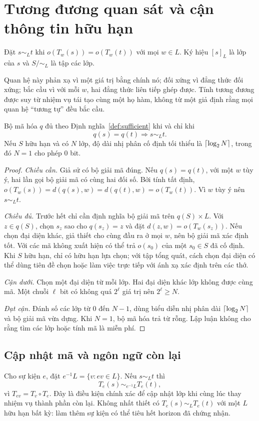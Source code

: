 \section{Tương đương quan sát và cận thông tin hữu hạn}\label{sec:finite}
\begin{definition}
Đặt $s\sim_L t$ khi $o(T_w(s))=o(T_w(t))$ với mọi $w\in L$. Ký hiệu $[s]_L$ là lớp của $s$ và $S/{\sim_L}$ là tập các lớp.
\end{definition}
Quan hệ này phản xạ vì một giá trị bằng chính nó; đối xứng vì đẳng thức đối xứng; bắc cầu vì với mỗi $w$, hai đẳng thức liên tiếp ghép được. Tính tương đương được suy từ nhiệm vụ tái tạo cùng một họ hàm, không từ một giả định rằng mọi quan hệ ``tương tự'' đều bắc cầu.

\begin{theorem}\label{thm:factor}
Bộ mã hóa $q$ đủ theo Định nghĩa~\ref{def:sufficient} khi và chỉ khi
\[
q(s)=q(t)\Longrightarrow s\sim_L t.
\]
Nếu $S$ hữu hạn và có $N$ lớp, độ dài nhị phân cố định tối thiểu là $\left\lceil \log_2N\right\rceil$, trong đó $N=1$ cho phép 0 bit.
\end{theorem}
\begin{proof}
\emph{Chiều cần.} Giả sử có bộ giải mã đúng. Nếu $q(s)=q(t)$, với một $w$ tùy ý, hai lần gọi bộ giải mã có cùng hai đối số. Bởi tính tất định,
$o(T_w(s))=d(q(s),w)=d(q(t),w)=o(T_w(t))$. Vì $w$ tùy ý nên $s\sim_Lt$.

\emph{Chiều đủ.} Trước hết chỉ cần định nghĩa bộ giải mã trên $q(S)\times L$. Với $z\in q(S)$, chọn $s_z$ sao cho $q(s_z)=z$ và đặt $d(z,w)=o(T_w(s_z))$. Nếu chọn đại diện khác, giả thiết cho cùng đầu ra ở mọi $w$, nên bộ giải mã xác định tốt. Với các mã không xuất hiện có thể trả $o(s_0)$ của một $s_0\in S$ đã cố định. Khi $S$ hữu hạn, chỉ có hữu hạn lựa chọn; với tập tổng quát, cách chọn đại diện có thể dùng tiên đề chọn hoặc làm việc trực tiếp với ánh xạ xác định trên các thớ.

\emph{Cận dưới.} Chọn một đại diện từ mỗi lớp. Hai đại diện khác lớp không được cùng mã. Một chuỗi $\ell$ bit có không quá $2^\ell$ giá trị nên $2^\ell\ge N$.

\emph{Đạt cận.} Đánh số các lớp từ $0$ đến $N-1$, dùng biểu diễn nhị phân dài $\left\lceil \log_2N\right\rceil$ và bộ giải mã vừa dựng. Khi $N=1$, bộ mã hóa trả từ rỗng. Lập luận không cho rằng tìm các lớp hoặc tính mã là miễn phí.
\end{proof}

\subsection{Cập nhật mã và ngôn ngữ còn lại}
Cho sự kiện $e$, đặt $e^{-1}L=\{v:ev\in L\}$. Nếu $s\sim_Lt$ thì
\[
T_e(s)\sim_{e^{-1}L}T_e(t),
\]
vì $T_{ev}=T_v\circ T_e$. Đây là điều kiện chính xác để cập nhật lớp khi cùng lúc thay nhiệm vụ thành phần còn lại. Không nhất thiết có $T_e(s)\sim_LT_e(t)$ với một $L$ hữu hạn bất kỳ: làm thêm sự kiện có thể tiêu hết horizon đã chứng nhận.

